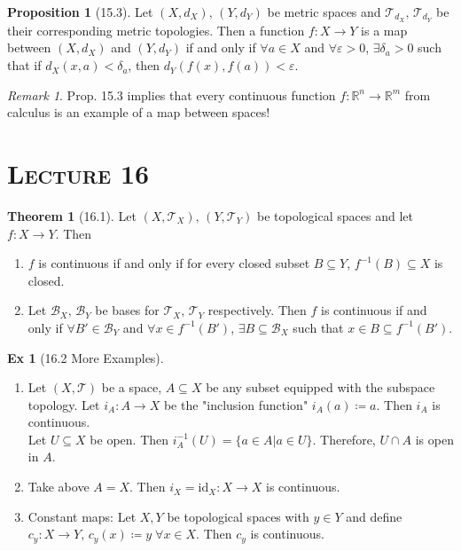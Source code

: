 \documentclass{article}
\newcommand{\R}{\ensuremath{\mathbb{R}}}
\newcommand{\B}{\ensuremath{\mathcal{B}}}
\newcommand{\Iff}{if and only if}
\newcommand{\coleq}{\ensuremath{\coloneqq}}
\newcommand{\func}[3]{\ensuremath{#1: #2 \to #3}}
\newcommand{\tp}{\ensuremath{\mathcal{T}}}
\newcommand{\Ts}[2]{\ensuremath{(#1,#2)}}
\newcommand{\inter}{\cap}
\renewcommand{\Subset}{\subseteq}
\theoremstyle{definition}
\newtheorem*{thm}{Theorem}
\newtheorem*{prop}{Proposition}
\newtheorem*{ex}{Ex}
\theoremstyle{remark}
\newtheorem*{rmk}{Remark}
\begin{document}
{        \begin{prop}[15.3]
            Let $(X,d_X), \, (Y,d_Y)$ be metric spaces and $\tp_{d_X}, \, \tp_{d_Y}$ be their corresponding metric topologies. Then a function $\func{f}{X}{Y}$ is a map between $(X,d_X)$ and $(Y,d_Y)$ \Iff{} $\forall a \in X$ and $\forall \varepsilon > 0$, $\exists \delta_a > 0$ such that if $d_X(x,a) < \delta_a$, then $d_Y(f(x),f(a))<\varepsilon$.
        \end{prop}
        
        \begin{rmk}
            Prop. 15.3 implies that every continuous function $\func{f}{\R^n}{\R^m}$ from calculus is an example of a map between spaces!
        \end{rmk}
        }
        
    \noindent\section*{\textbf{\textsc{Lecture 16}}}{
        \begin{thm}[16.1]
            Let $\Ts{X}{\tp_X}, \, \Ts{Y}{\tp_Y}$ be topological spaces and let $\func{f}{X}{Y}$. Then
            \begin{enumerate}
                \item $f$ is continuous \Iff{} for every closed subset $B \Subset Y$, $f^{-1}(B) \Subset X$ is closed.
                \item Let $\B_X, \, \B_Y$ be bases for $\tp_X, \, \tp_Y$ respectively. Then $f$ is continuous \Iff{} $\forall B' \in \B_Y$ and $\forall x \in f^{-1}(B')$, $\exists B \Subset \B_X$ such that $x \in B \Subset f^{-1}(B')$.
            \end{enumerate}
        \end{thm}
        
        \begin{ex}[16.2 More Examples]\hfill
            \begin{enumerate}
                \item Let $\Ts{X}{\tp}$ be a space, $A \Subset X$ be any subset equipped with the subspace topology. Let $\func{i_A}{A}{X}$ be the "inclusion function" $i_A(a) \coleq a$. Then $i_A$ is continuous.\\
                Let $U \Subset X$ be open. Then $i^{-1}_A(U)=\{a\in A|a \in U\}$. Therefore, $U \inter A$ is open in $A$.
                \item Take above $A=X$. Then $i_X=\func{\mathrm{id}_X}{X}{X}$ is continuous.
                \item Constant maps: Let $X,Y$ be topological spaces with $y\in Y$ and define $\func{c_y}{X}{Y}, \, c_y(x)\coleq y \; \forall x\in X$. Then $c_y$ is continuous.
            \end{enumerate}
        \end{ex}
        
}
\end{document}
